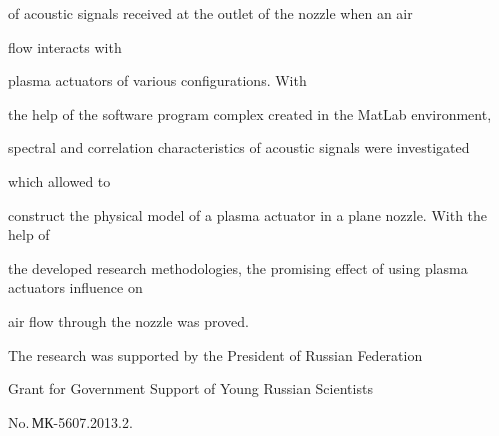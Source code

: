 {of acoustic signals received at the outlet of the nozzle when an air 


flow interacts with 


plasma actuators of various configurations. With 


the help of the software program complex created in the MatLab environment,


spectral and correlation characteristics of acoustic signals were investigated 


which allowed  to 


construct the physical model of a plasma actuator in a  plane nozzle. With the help of 


the developed research methodologies, the promising effect of using plasma actuators influence on


air  flow through the nozzle was proved.


}   





















\Ack


\noindent


The research  was supported by the President of Russian Federation 


Grant for Government Support of Young Russian Scientists


No.\,МК-5607.2013.2.








\renewcommand{\bibname}{\protect\rmfamily References}





